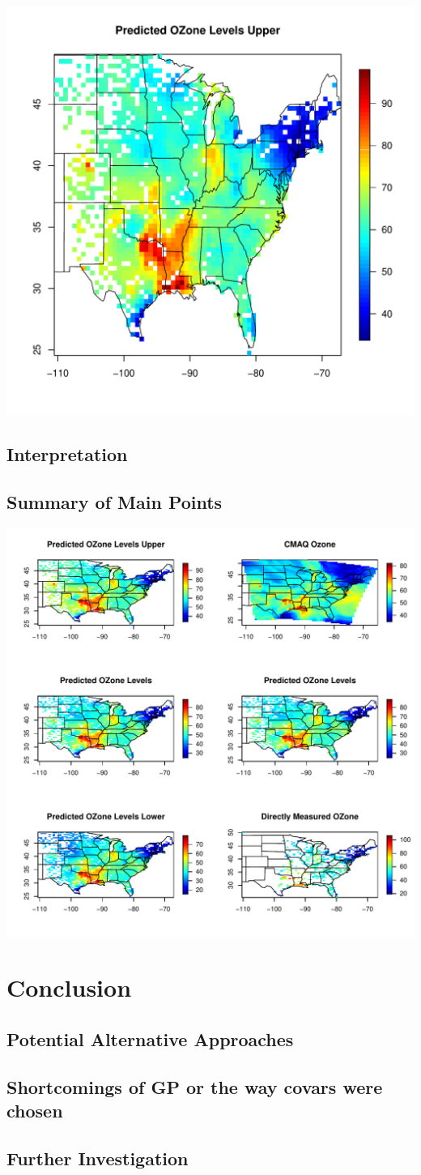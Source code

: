 \documentclass{article}                                                   %
\begin{document}
    \includegraphics{raw/upper.pdf}
  \subsection{Interpretation}
  \subsection{Summary of Main Points}
    \includegraphics{raw/all.pdf}
\section{Conclusion}
  \subsection{Potential Alternative Approaches}
  \subsection{Shortcomings of GP or the way covars were chosen}
  \subsection{Further Investigation}
\end{document}
